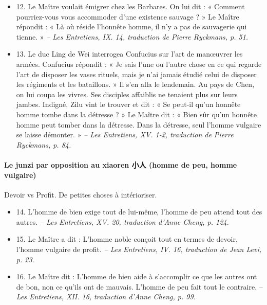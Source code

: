 \begin{itemize}
\item 12. \newline Le Maître voulait émigrer chez les Barbares. On lui dit : « Comment pourriez-vous vous accommoder d’une existence sauvage ? » \newline Le Maître répondit : « Là où réside l’honnête homme, il n’y a pas de sauvagerie qui tienne. » \textit{\small -- Les Entretiens, IX. 14, traduction de Pierre Ryckmans, p. 51.  }

\item 13. \newline Le duc Ling de Wei interrogea Confucius sur l’art de manœuvrer les armées. Confucius répondit : \newline « Je sais l’une ou l’autre chose en ce qui regarde l’art de disposer les vases rituels, mais je n’ai jamais étudié celui de disposer les régiments et les bataillons. » \newline Il s’en alla le lendemain.          Au pays de Chen, on lui coupa les vivres. Ses disciples affaiblis ne tenaient plus sur leurs jambes. Indigné, Zilu vint le trouver et dit : \newline « Se peut-il qu’un honnête homme tombe dans la détresse ? » \newline Le Maître dit : « Bien sûr qu’un honnête homme peut tomber dans la détresse. Dans la détresse, seul l’homme vulgaire se laisse démonter. »  \textit{\small -- Les Entretiens, XV. 1-2, traduction de Pierre Ryckmans, p. 84.  }
\end{itemize}
\paragraph{Le junzi par opposition au xiaoren 小人 (homme de peu, homme vulgaire)  }
\begin{Synthesis}
    Devoir vs Profit. 
    De petites choses à intérioriser. 
\end{Synthesis}
\begin{itemize}

\item 14. \newline L’homme de bien exige tout de lui-même, l’homme de peu attend tout des autres.  \textit{\small -- Les Entretiens, XV. 20, traduction d’Anne Cheng, p. 124.  }
\item 15. \newline Le Maître a dit :  L’homme noble conçoit tout en termes de devoir, l’homme vulgaire de profit. \textit{\small -- Les Entretiens, IV. 16, traduction de Jean Levi, p. 23.  }
\item 16. \newline Le Maître dit : L’homme de bien aide à s’accomplir ce que les autres ont de bon, non ce qu’ils ont de mauvais. L’homme de peu fait tout le contraire.  -- \textit{\small Les Entretiens, XII.  16, traduction d’Anne Cheng, p. 99.  }
\end{itemize}
